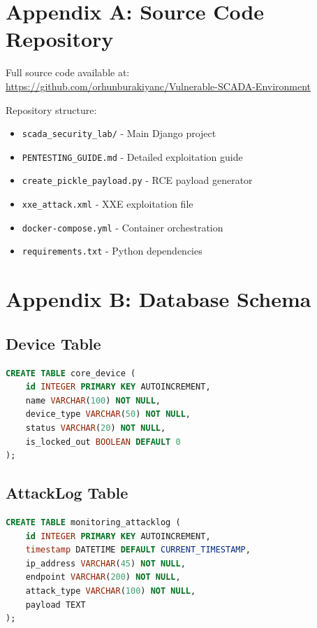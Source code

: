 \documentclass[12pt,a4paper]{article}
\begin{document}
\newpage

\appendix

\section{Appendix A: Source Code Repository}

Full source code available at:\\
\url{https://github.com/orhunburakiyanc/Vulnerable-SCADA-Environment}

Repository structure:
\begin{itemize}[leftmargin=*]
    \item \texttt{scada\_security\_lab/} - Main Django project
    \item \texttt{PENTESTING\_GUIDE.md} - Detailed exploitation guide
    \item \texttt{create\_pickle\_payload.py} - RCE payload generator
    \item \texttt{xxe\_attack.xml} - XXE exploitation file
    \item \texttt{docker-compose.yml} - Container orchestration
    \item \texttt{requirements.txt} - Python dependencies
\end{itemize}

\section{Appendix B: Database Schema}

\subsection{Device Table}
\begin{lstlisting}[language=SQL]
CREATE TABLE core_device (
    id INTEGER PRIMARY KEY AUTOINCREMENT,
    name VARCHAR(100) NOT NULL,
    device_type VARCHAR(50) NOT NULL,
    status VARCHAR(20) NOT NULL,
    is_locked_out BOOLEAN DEFAULT 0
);
\end{lstlisting}

\subsection{AttackLog Table}
\begin{lstlisting}[language=SQL]
CREATE TABLE monitoring_attacklog (
    id INTEGER PRIMARY KEY AUTOINCREMENT,
    timestamp DATETIME DEFAULT CURRENT_TIMESTAMP,
    ip_address VARCHAR(45) NOT NULL,
    endpoint VARCHAR(200) NOT NULL,
    attack_type VARCHAR(100) NOT NULL,
    payload TEXT
);
\end{lstlisting}
\end{document}
